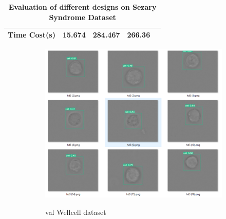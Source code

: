 \begin{table}[t]
{\begin{tabular}{@{}clccc@{}}
Time Cost(s)                                   & 15.674                                                                                                              & 284.467                                                                                                                             & 266.36                                                                                                                                                            \\ \bottomrule
\end{tabular}}
\caption{\textbf{Evaluation of different designs on Sezary Syndrome Dataset}}
\end{table}


\begin{figure}[t]
	\begin{center}
		\begin{subfigure}[c]{0.6\textwidth}
			\includegraphics[width=\textwidth]{thesis-template-master/images/An illustration test performance of CellYolo best weight.png}
			\label{fig:Debris}
			\caption{val Wellcell dataset}
		\end{subfigure}
		\begin{subfigure}[c]{0.6\textwidth}

\end{subfigure}
\end{center}
\end{figure}
